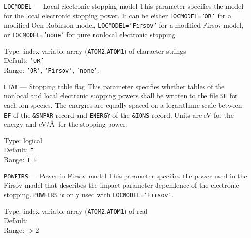 \begin{keydescription}{\texttt{LOCMODEL} --- Local electronic stopping model}
%
  This parameter specifies the model for the local electronic stopping power.
  It can be either \texttt{LOCMODEL='OR'} for a modified Oen-Robinson model,
  \texttt{LOCMODEL='Firsov'} for a modified Firsov model, or
  \texttt{LOCMODEL='none'} for pure nonlocal electronic stopping.
  \begin{keytab}
    Type:    \> index variable array (\texttt{ATOM2},\texttt{ATOM1}) 
                of character strings \\
    Default: \> \texttt{'OR'} \\
    Range:   \> \texttt{'OR'}, \texttt{'Firsov'}, \texttt{'none'}.
  \end{keytab}
\end{keydescription}

\begin{keydescription}{\texttt{LTAB} --- Stopping table flag}
%
  This parameter specifies whether tables of the nonlocal and local electronic
  stopping powers shall be written to the file \texttt{SE} for each ion 
  species. The energies are equally spaced on a logarithmic
  scale between \texttt{EF} of the \texttt{\&SNPAR} record and
  \texttt{ENERGY} of the \texttt{\&IONS} record.  Units are eV for the
  energy and eV/\AA\ for the stopping power.  
  \begin{keytab}
    Type:    \> logical \\
    Default: \> \texttt{F} \\
    Range:   \> \texttt{T}, \texttt{F}
  \end{keytab}
\end{keydescription}

\begin{keydescription}{\texttt{POWFIRS} --- Power in Firsov model}
%
  This parameter specifies the power used in the Firsov model that
  describes the impact parameter dependence of the electronic stopping.
  \texttt{POWFIRS} is only used with \texttt{LOCMODEL='Firsov'}.
  \begin{keytab}
    Type:    \> index variable array (\texttt{ATOM2},\texttt{ATOM1}) 
                of real \\
    Default:  \\
    Range:   \> $> 2$
  \end{keytab}
\end{keydescription}


